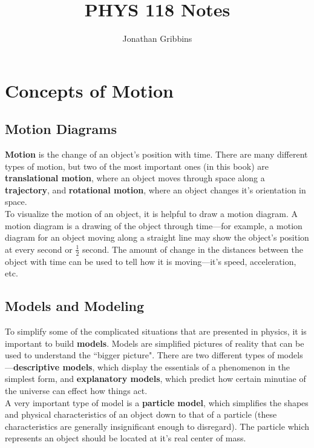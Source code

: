 \documentclass[12pt,letterpaper]{article}
\author{Jonathan Gribbins}
\title{PHYS 118 Notes}
\date{}
\begin{document}
\maketitle

\tableofcontents

\pagebreak

\section[Concepts of Motion]{Concepts of Motion}

\subsection[Motion Diagrams]{Motion Diagrams}

\textbf{Motion} is the change of an object's position with time. There are many different types of motion, but two of the most important ones (in this book) are \textbf{translational motion}, where an object moves through space along a \textbf{trajectory}, and \textbf{rotational motion}, where an object changes it's orientation in space. \\

To visualize the motion of an object, it is helpful to draw a motion diagram. A motion diagram is a drawing of the object through time---for example, a motion diagram for an object moving along a straight line may show the object's position at every second or $\frac{1}{2}$ second. The amount of change in the distances between the object with time can be used to tell how it is moving---it's speed, acceleration, etc.

\subsection[Models and Modeling]{Models and Modeling}

To simplify some of the complicated situations that are presented in physics, it is important to build \textbf{models}. Models are simplified pictures of reality that can be used to understand the ``bigger picture". There are two different types of models---\textbf{descriptive models}, which display the essentials of a phenomenon in the simplest form, and \textbf{explanatory models}, which predict how certain minutiae of the universe can effect how things act. \\

A very important type of model is a \textbf{particle model}, which simplifies the shapes and physical characteristics of an object down to that of a particle (these characteristics are generally insignificant enough to disregard). The particle which represents an object should be located at it's real center of mass. \\
\end{document}
